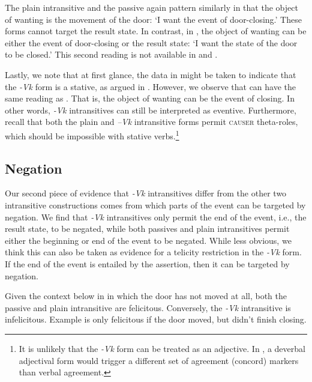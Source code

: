\documentclass[output=paper]{langsci/lanmgscibook}
\begin{document}
The plain intransitive and the passive again pattern similarly in that the object of wanting is the movement of the door: ‘I want the event of door-closing.’ These forms cannot target the result state. In contrast, in , the object of wanting can be either the event of door-closing or the result state: ‘I want the state of the door to be closed.’ This second reading is not available in  and .

Lastly, we note that at first glance, the data in  might be taken to indicate that the \textit{-Vk} form is a stative, as argued in \citet{Dubinsky1996}. However, we observe that  can have the same reading as . That is, the object of wanting can be the event of closing. In other words, \textit{-Vk} intransitives can still be interpreted as eventive. Furthermore, recall that both the plain and \textit{–Vk} intransitive forms permit \textsc{causer} theta-roles, which should be impossible with stative verbs.\footnote{It is unlikely that the \textit{-Vk} form can be treated as an adjective. In , a deverbal adjectival form would trigger a different set of agreement (concord) markers than verbal agreement.}

\subsection{Negation} 

Our second piece of evidence that \textit{-Vk} intransitives differ from the other two intransitive constructions comes from which parts of the event can be targeted by negation. We find that \textit{-Vk} intransitives only permit the end of the event, i.e., the result state, to be negated, while both passives and plain intransitives permit either the beginning or end of the event to be negated. While less obvious, we think this can also be taken as evidence for a telicity restriction in the \textit{-Vk} form. If the end of the event is entailed by the assertion, then it can be targeted by negation. 

Given the context below in  in which the door has not moved at all, both the passive  and plain intransitive  are felicitous. Conversely, the \textit{-Vk} intransitive  is infelicitous. Example  is only felicitous if the door moved, but didn’t finish closing.
\end{document}
